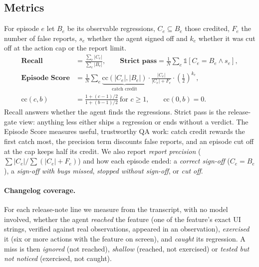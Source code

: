 \documentclass[11pt]{article}
\begin{document}
\subsection{Metrics}\label{sec:metrics}
For episode $e$ let $B_e$ be its observable regressions, $C_e \subseteq B_e$ those credited,
$F_e$ the number of false reports, $s_e$ whether the agent signed off and $k_e$ whether it was cut
off at the action cap or the report limit.
\begin{align*}
\textbf{Recall} &= \frac{\sum_e |C_e|}{\sum_e |B_e|}, \qquad
\textbf{Strict pass} = \frac{1}{N}\sum_e \mathbb{1}\left[C_e = B_e \wedge s_e\right],\\
\textbf{Episode Score} &= \frac{1}{N}\sum_e \underbrace{\mathrm{cc}(|C_e|, |B_e|)}_{\text{catch credit}}
\cdot \frac{|C_e|}{|C_e| + F_e} \cdot \left(\tfrac{1}{2}\right)^{k_e},\\
\mathrm{cc}(c, b) &= \frac{1 + (c-1)/2}{1 + (b-1)/2}\ \text{for } c \ge 1, \qquad \mathrm{cc}(0,b)=0.
\end{align*}
Recall answers whether the agent finds the regressions. Strict pass is the release-gate view:
anything less either ships a regression or ends without a verdict. The Episode Score measures
useful, trustworthy QA work: catch credit rewards the first catch most, the precision term
discounts false reports, and an episode cut off at the cap keeps half its credit. We also report
\emph{report precision} ($\sum|C_e| / \sum(|C_e| + F_e)$) and how each episode ended: a
\emph{correct sign-off} ($C_e = B_e$), a \emph{sign-off with bugs missed}, \emph{stopped without
sign-off}, or \emph{cut off}.

\paragraph{Changelog coverage.} For each release-note line we measure from the transcript, with no
model involved, whether the agent \emph{reached} the feature (one of the feature's exact UI strings,
verified against real observations, appeared in an observation), \emph{exercised} it (six or more
actions with the feature on screen), and \emph{caught} its regression. A miss is then
\emph{ignored} (not reached), \emph{shallow} (reached, not exercised) or \emph{tested but not
noticed} (exercised, not caught).
\end{document}
